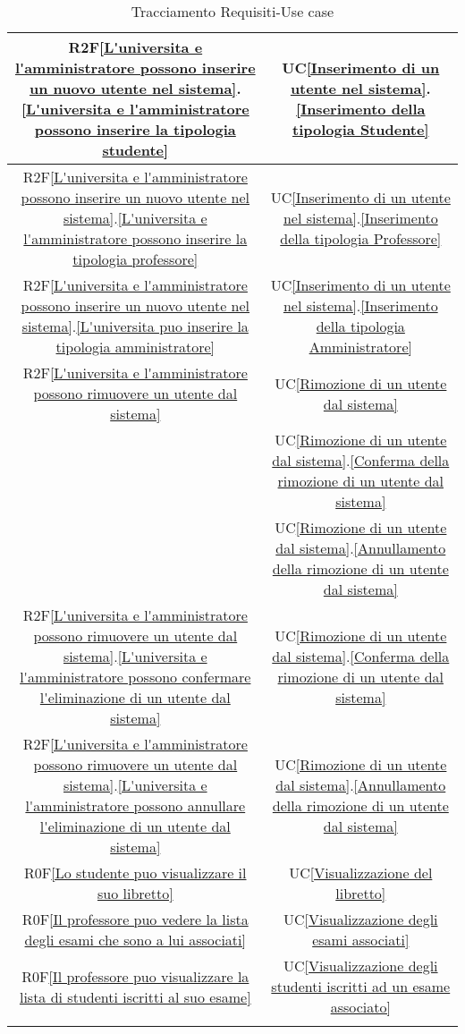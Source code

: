 \begin{longtable}{|c|c|}
\hline
R2F\ref{L'universita e l'amministratore possono inserire un nuovo utente nel sistema}.\ref{L'universita e l'amministratore possono inserire la tipologia studente} & UC\ref{Inserimento di un utente nel sistema}.\ref{Inserimento della tipologia Studente}\\
\hline
R2F\ref{L'universita e l'amministratore possono inserire un nuovo utente nel sistema}.\ref{L'universita e l'amministratore possono inserire la tipologia professore} & UC\ref{Inserimento di un utente nel sistema}.\ref{Inserimento della tipologia Professore}\\
\hline
R2F\ref{L'universita e l'amministratore possono inserire un nuovo utente nel sistema}.\ref{L'universita puo inserire la tipologia amministratore} & UC\ref{Inserimento di un utente nel sistema}.\ref{Inserimento della tipologia Amministratore}\\
\hline
R2F\ref{L'universita e l'amministratore possono rimuovere un utente dal sistema} & UC\ref{Rimozione di un utente dal sistema}\\
& UC\ref{Rimozione di un utente dal sistema}.\ref{Conferma della rimozione di un utente dal sistema}\\
& UC\ref{Rimozione di un utente dal sistema}.\ref{Annullamento della rimozione di un utente dal sistema}\\
\hline
R2F\ref{L'universita e l'amministratore possono rimuovere un utente dal sistema}.\ref{L'universita e l'amministratore possono confermare l'eliminazione di un utente dal sistema} & UC\ref{Rimozione di un utente dal sistema}.\ref{Conferma della rimozione di un utente dal sistema}\\
\hline
R2F\ref{L'universita e l'amministratore possono rimuovere un utente dal sistema}.\ref{L'universita e l'amministratore possono annullare l'eliminazione di un utente dal sistema} & UC\ref{Rimozione di un utente dal sistema}.\ref{Annullamento della rimozione di un utente dal sistema}\\
\hline
R0F\ref{Lo studente puo visualizzare il suo libretto} & UC\ref{Visualizzazione del libretto}\\
\hline
R0F\ref{Il professore puo vedere la lista degli esami che sono a lui associati} & UC\ref{Visualizzazione degli esami associati}\\
\hline
R0F\ref{Il professore puo visualizzare la lista di studenti iscritti al suo esame} & UC\ref{Visualizzazione degli studenti iscritti ad un esame associato}\\
\hline
\caption[Tracciamento Requisiti-Use case]{Tracciamento Requisiti-Use case}
\label{tabella:requi-usecase}
\end{longtable}
\clearpage

